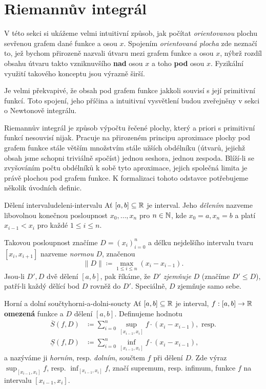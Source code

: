 \section{Riemannův integrál}
\label{sec:riemannuv-integral}

V této sekci si ukážeme velmi intuitivní způsob, jak počítat \emph{orientovanou}
plochu sevřenou grafem dané funkce a osou $x$. Spojením \emph{orientovaná
	plocha} zde neznačí to, jež bychom přirozeně nazvali  útvaru mezi
grafem funkce a osou $x$, nýbrž rozdíl obsahu útvaru takto vzniknuvšího
\textbf{nad} osou $x$ a toho \textbf{pod} osou $x$. Fyzikální využití takového
konceptu jsou výrazně širší.

Je velmi překvapivé, že obsah pod grafem funkce jakkoli souvisí s její
primitivní funkcí. Toto spojení, jeho příčina a intuitivní vysvětlení budou
zveřejněny v sekci o Newtonově integrálu.

Riemannův integrál je způsob výpočtu řečené plochy, který a priori s primitivní
funkcí nesouvisí nijak. Pracuje na přirozeném principu aproximace plochy pod
grafem funkce stále větším množstvím stále užších obdélníku (útvarů, jejichž
obsah jsme schopni triviálně spočíst) jednou seshora, jednou zespoda. Blíží-li
se zvyšováním počtu obdélníků k sobě tyto aproximace, jejich společná limita je
právě plochou pod grafem funkce. K formalizaci tohoto odstavce potřebujeme
několik úvodních definic.

\begin{definition}{Dělení intervalu}{deleni-intervalu}
	Ať $[a,b] \subseteq \mathbb{R}$ je interval. Jeho \emph{dělením} nazveme libovolnou
	konečnou posloupnost $x_0,\ldots,x_n$ pro $n \in \mathbb{N}$, kde $x_0 = a, x_n = b$ a
	platí $x_{i-1} < x_{i}$ pro každé $1 \leq i \leq n$.

	Takovou posloupnost značíme $D = (x_i)_{i=0}^{n}$ a délku nejdelšího intervalu
	tvaru $[x_i,x_{i+1}]$ nazveme \emph{normou} $D$, značenou
	\[
		\|D\| \coloneqq \max_{1 \leq i \leq n} (x_{i} - x_{i-1}).
	\]
	Jsou-li $D',D$ dvě dělení $[a,b]$, pak říkáme, že $D'$ \emph{zjemňuje} $D$
	(značíme $D' \leq D$), patří-li každý dělící bod $D$ rovněž do $D'$.
	Speciálně, $D$ zjemňuje samo sebe.
\end{definition}

\begin{definition}{Horní a dolní součty}{horni-a-dolni-soucty}
	Ať $[a,b] \subseteq \mathbb{R}$ je interval, $f:[a,b] \to \mathbb{R}$ \textbf{omezená} funkce a
	$D$ dělení $[a,b]$. Definujeme hodnotu
	\begin{align*}
		\overline{S}(f,D)  & \coloneqq \sum_{i=0}^n \sup_{[x_{i-1},x_i]} f \cdot (x_i -
		x_{i-1}), \text{ resp.}                                                         \\
		\underline{S}(f,D) & \coloneqq \sum_{i=0}^n \inf_{[x_{i-1},x_i]} f \cdot (x_i
		- x_{i-1}),
	\end{align*}
	a nazýváme ji \emph{horním}, resp. \emph{dolním}, součtem $f$ při dělení $D$.
	Zde výraz $\sup_{[x_{i-1},x_i]} f$, resp. $\inf_{[x_{i-1},x_i]} f$, značí
	supremum, resp. infimum, funkce $f$ na intervalu $[x_{i-1},x_i]$.
\end{definition}

